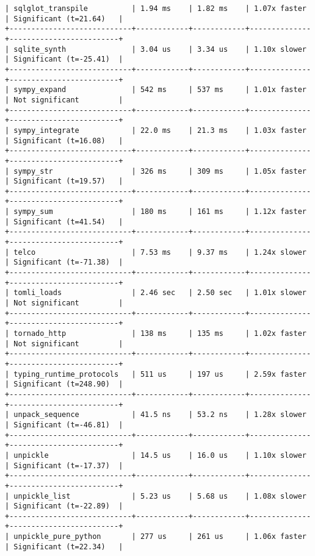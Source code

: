 \begin{code}
\begin{verbatim}
| sqlglot_transpile          | 1.94 ms    | 1.82 ms    | 1.07x faster | Significant (t=21.64)   |
+----------------------------+------------+------------+--------------+-------------------------+
| sqlite_synth               | 3.04 us    | 3.34 us    | 1.10x slower | Significant (t=-25.41)  |
+----------------------------+------------+------------+--------------+-------------------------+
| sympy_expand               | 542 ms     | 537 ms     | 1.01x faster | Not significant         |
+----------------------------+------------+------------+--------------+-------------------------+
| sympy_integrate            | 22.0 ms    | 21.3 ms    | 1.03x faster | Significant (t=16.08)   |
+----------------------------+------------+------------+--------------+-------------------------+
| sympy_str                  | 326 ms     | 309 ms     | 1.05x faster | Significant (t=19.57)   |
+----------------------------+------------+------------+--------------+-------------------------+
| sympy_sum                  | 180 ms     | 161 ms     | 1.12x faster | Significant (t=41.54)   |
+----------------------------+------------+------------+--------------+-------------------------+
| telco                      | 7.53 ms    | 9.37 ms    | 1.24x slower | Significant (t=-71.38)  |
+----------------------------+------------+------------+--------------+-------------------------+
| tomli_loads                | 2.46 sec   | 2.50 sec   | 1.01x slower | Not significant         |
+----------------------------+------------+------------+--------------+-------------------------+
| tornado_http               | 138 ms     | 135 ms     | 1.02x faster | Not significant         |
+----------------------------+------------+------------+--------------+-------------------------+
| typing_runtime_protocols   | 511 us     | 197 us     | 2.59x faster | Significant (t=248.90)  |
+----------------------------+------------+------------+--------------+-------------------------+
| unpack_sequence            | 41.5 ns    | 53.2 ns    | 1.28x slower | Significant (t=-46.81)  |
+----------------------------+------------+------------+--------------+-------------------------+
| unpickle                   | 14.5 us    | 16.0 us    | 1.10x slower | Significant (t=-17.37)  |
+----------------------------+------------+------------+--------------+-------------------------+
| unpickle_list              | 5.23 us    | 5.68 us    | 1.08x slower | Significant (t=-22.89)  |
+----------------------------+------------+------------+--------------+-------------------------+
| unpickle_pure_python       | 277 us     | 261 us     | 1.06x faster | Significant (t=22.34)   |

\end{verbatim}
\end{code}
